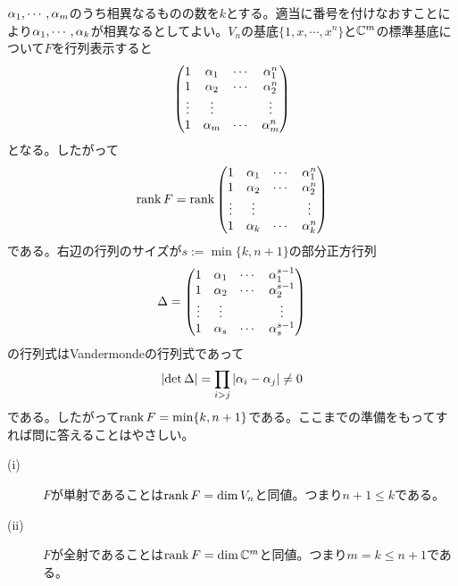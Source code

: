 \subsubsection{}%
\begin{sol}
  ${\alpha}_1, \cdots , {\alpha}_m$のうち相異なるものの数を$k$とする。適当に番号を付けなおすことにより${\alpha}_1, \cdots , {\alpha}_k$が相異なるとしてよい。$V_n$の基底$\{1,x , \cdots , x^n\}$と${\mathbb C}^m$の標準基底について$F$を行列表示すると
  \[
  \begin{pmatrix}  1 & {\alpha}_1 & \cdots &  {\alpha}_1^n \\  1 & {\alpha}_2 & \cdots &  {\alpha}_2^n \\ \vdots & \vdots & & \vdots \\ 1 & {\alpha}_m & \cdots &  {\alpha}_m^n \end{pmatrix}
  \]
  となる。したがって
  \[
  \operatorname{rank} F = \operatorname{rank} \begin{pmatrix}  1 & {\alpha}_1 & \cdots &  {\alpha}_1^n \\  1 & {\alpha}_2 & \cdots &  {\alpha}_2^n \\ \vdots & \vdots & & \vdots \\ 1 & {\alpha}_k & \cdots &  {\alpha}_k^n \end{pmatrix}
  \]
  である。右辺の行列のサイズが$s := \min\{ k,n+1 \}$の部分正方行列
  \[
  {\Delta} = \begin{pmatrix}  1 & {\alpha}_1 & \cdots &  {\alpha}_1^{s-1} \\  1 & {\alpha}_2 & \cdots &  {\alpha}_2^{s-1} \\ \vdots & \vdots & & \vdots \\ 1 & {\alpha}_s & \cdots &  {\alpha}_s^{s-1} \end{pmatrix}
  \]
  の行列式はVandermondeの行列式であって
  \[
  \left \lvert \det {\Delta} \right \rvert = \prod_{i > j} \left \lvert  {\alpha}_i - {\alpha}_j  \right \rvert \neq 0
  \]
  である。したがって$\operatorname{rank} F = \min\{ k,n+1 \}$である。ここまでの準備をもってすれば問に答えることはやさしい。
  \begin{description}
    \item[(i)] $F$が単射であることは$\operatorname{rank} F = \dim V_n$と同値。つまり$n+1 \leq k$である。
    \item[(ii)] $F$が全射であることは$\operatorname{rank} F = \dim {\mathbb C}^m$と同値。つまり$m = k \leq n+1$である。
  \end{description}

\end{sol}


